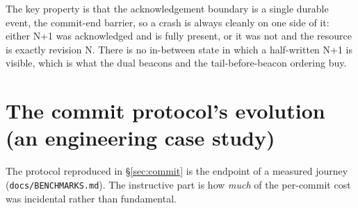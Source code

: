 \documentclass[11pt,a4paper,oneside]{report}
\theoremstyle{sirixthm}
\newcommand{\code}[1]{\texttt{#1}}
\begin{document}
The key property is that the acknowledgement boundary is a single durable event, the commit-end
barrier, so a crash is always cleanly on one side of it: either N+1 was acknowledged and is fully
present, or it was not and the resource is exactly revision N. There is no in-between state in which a
half-written N+1 is visible, which is what the dual beacons and the tail-before-beacon ordering buy.

\section{The commit protocol's evolution (an engineering case study)}
\label{sec:evolution}

The protocol reproduced in \S\ref{sec:commit} is the endpoint of a measured journey
(\code{docs/BENCHMARKS.md}). The instructive part is how \emph{much} of the per-commit cost
was incidental rather than fundamental.
\end{document}
